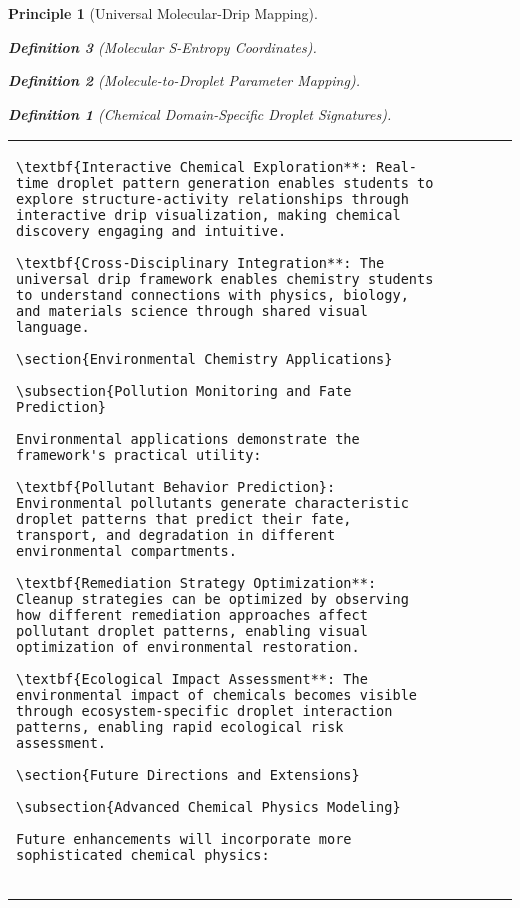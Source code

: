 \documentclass[12pt,a4paper]{article}
\newtheorem{definition}{Definition}
\newtheorem{principle}{Principle}
\begin{document}
\begin{principle}[Universal Molecular-Drip Mapping]
\begin{definition}[Molecular S-Entropy Coordinates]
\begin{definition}[Molecule-to-Droplet Parameter Mapping]
\begin{algorithm}
\begin{algorithmic}[1]
\begin{definition}[Chemical Domain-Specific Droplet Signatures]
\begin{table}[H]
\begin{tabular}{lcccc}
\begin{lstlisting}[style=pythonstyle, caption=Computer Vision Comprehensive Chemical Pattern Analysis]
\textbf{Interactive Chemical Exploration**: Real-time droplet pattern generation enables students to explore structure-activity relationships through interactive drip visualization, making chemical discovery engaging and intuitive.

\textbf{Cross-Disciplinary Integration**: The universal drip framework enables chemistry students to understand connections with physics, biology, and materials science through shared visual language.

\section{Environmental Chemistry Applications}

\subsection{Pollution Monitoring and Fate Prediction}

Environmental applications demonstrate the framework's practical utility:

\textbf{Pollutant Behavior Prediction}: Environmental pollutants generate characteristic droplet patterns that predict their fate, transport, and degradation in different environmental compartments.

\textbf{Remediation Strategy Optimization**: Cleanup strategies can be optimized by observing how different remediation approaches affect pollutant droplet patterns, enabling visual optimization of environmental restoration.

\textbf{Ecological Impact Assessment**: The environmental impact of chemicals becomes visible through ecosystem-specific droplet interaction patterns, enabling rapid ecological risk assessment.

\section{Future Directions and Extensions}

\subsection{Advanced Chemical Physics Modeling}

Future enhancements will incorporate more sophisticated chemical physics:


\end{lstlisting}
\end{tabular}
\end{table}
\end{definition}
\end{algorithmic}
\end{algorithm}
\end{definition}
\end{definition}
\end{principle}
\end{document}

